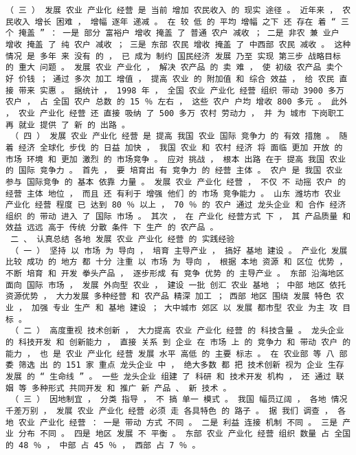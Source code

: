 \documentclass{article}
\begin{document}
\begin{Verbatim}[commandchars=\\\{\}]
 （ 三 ） 发展 农业 产业化 经营 是 当前 增加 农民收入 的 现实 途径 。 近年来 ， 农民收入 增长 困难 ， 增幅 逐年 递减 。 在 较 低 的 平均 增幅 之下 还 存在 着 “ 三个 掩盖 ” ： 一是 部分 富裕户 增收 掩盖 了 普通 农户 减收 ； 二是 非农 兼 业户 增收 掩盖 了 纯 农户 减收 ； 三是 东部 农民 增收 掩盖 了 中西部 农民 减收 。 这种 情况 是 多年 来 没有 的 ， 已 成为 制约 国民经济 发展 乃至 实现 第三步 战略目标 的 重大 问题 。 发展 农业 产业化 ， 解决 农产品 的 卖 难 ， 使 初级 农产品 卖个 好 价钱 ； 通过 多次 加工 增值 ， 提高 农业 的 附加值 和 综合 效益 ， 给 农民 直接 带来 实惠 。 据统计 ， 1998 年 ， 全国 农业 产业化 经营 组织 带动 3900 多万 农户 ， 占 全国 农户 总数 的 15 ％ 左右 ， 这些 农户 户均 增收 800 多元 。 此外 ， 农业 产业化 经营 还 直接 吸纳 了 500 多万 农村 劳动力 ， 并 为 城市 下岗职工 再 就业 提供 了 新 的 出路 。 
 （ 四 ） 发展 农业 产业化 经营 是 提高 我国 农业 国际 竞争力 的 有效 措施 。 随着 经济 全球化 步伐 的 日益 加快 ， 我国 农业 和 农村 经济 将 面临 更加 开放 的 市场 环境 和 更加 激烈 的 市场竞争 。 应对 挑战 ， 根本 出路 在于 提高 我国 农业 的 国际 竞争力 。 首先 ， 要 培育出 有 竞争力 的 经营 主体 。 农户 是 我国 农业 参与 国际竞争 的 基本 依靠 力量 。 发展 农业 产业化 经营 ， 不仅 不 动摇 农户 的 经营 主体 地位 ， 而且 还 有利于 增强 他们 的 市场 竞争能力 。 山东 潍坊市 农业 产业化 经营 程度 已 达到 80 ％ 以上 ， 70 ％ 的 农户 通过 龙头企业 和 合作 经济 组织 的 带动 进入 了 国际 市场 。 其次 ， 在 产业化 经营方式 下 ， 其 产品质量 和 效益 远远 高于 传统 分散 条件 下 生产 的 农产品 。 
 二 、 认真总结 各地 发展 农业 产业化 经营 的 实践经验 
 （ 一 ） 坚持 以 市场 为 导向 ， 培育 主导产业 ， 搞好 基地 建设 。 产业化 发展 比较 成功 的 地方 都 十分 注重 以 市场 为 导向 ， 根据 本地 资源 和 区位 优势 ， 不断 培育 和 开发 拳头产品 ， 逐步形成 有 竞争 优势 的 主导产业 。 东部 沿海地区 面向 国际 市场 ， 发展 外向型 农业 ， 建设 一批 创汇 农业 基地 ； 中部 地区 依托 资源优势 ， 大力发展 多种经营 和 农产品 精深 加工 ； 西部 地区 围绕 发展 特色 农业 ， 加强 专业 生产 和 基地 建设 ； 大中城市 郊区 以 发展 都市型 农业 为主 攻 目标 。 
 （ 二 ） 高度重视 技术创新 ， 大力提高 农业 产业化 经营 的 科技含量 。 龙头企业 的 科技开发 和 创新能力 ， 直接 关系 到 企业 在 市场 上 的 竞争力 和 带动 农户 的 能力 ， 也 是 农业 产业化 经营 发展 水平 高低 的 主要 标志 。 在 农业部 等 八 部委 筛选 出 的 151 家 重点 龙头企业 中 ， 绝大多数 都 把 技术创新 视为 企业 生存 发展 的 “ 生命线 ” 。 一些 龙头企业 组建 了 科研 和 技术开发 机构 ， 还 通过 联姻 等 多种形式 共同开发 和 推广 新 产品 、 新 技术 。 
 （ 三 ） 因地制宜 ， 分类 指导 ， 不 搞 单一 模式 。 我国 幅员辽阔 ， 各地 情况 千差万别 ， 发展 农业 产业化 经营 必须 走 各具特色 的 路子 。 据 我们 调查 ， 各地 农业 产业化 经营 ： 一是 带动 方式 不同 。 二是 利益 连接 机制 不同 。 三是 产业 分布 不同 。 四是 地区 发展 不 平衡 。 东部 农业 产业化 经营 组织 数量 占 全国 的 48 ％ ， 中部 占 45 ％ ， 西部 占 7 ％ 。 

\end{Verbatim}
\end{document}
